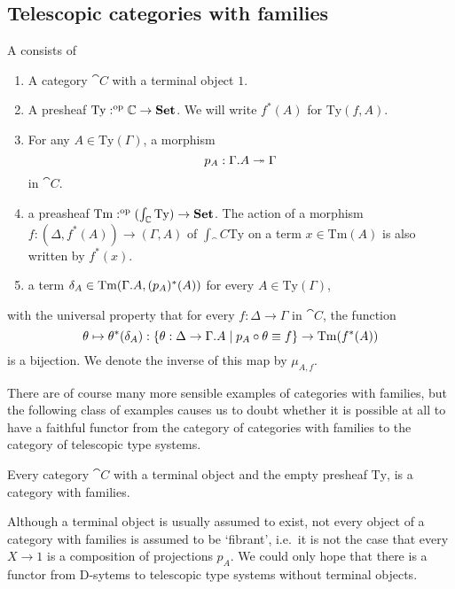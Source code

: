 \subsection{Telescopic categories with families}

\begin{defn}
A  consists of
\begin{enumerate}
\item A category $\cat{C}$ with a terminal object $1$.
\item A presheaf $\mathrm{Ty}:^{\mathrm{op}}{\mathbb{C}}\to\mathbf{Set}$. We will write
$f^\ast(A)$ for $\mathrm{Ty}(f,A)$.
\item For any $A\in\mathrm{Ty}(\Gamma)$, a morphism
\begin{equation*}
p_A : \ctxext{\Gamma}{A}\twoheadrightarrow \Gamma
\end{equation*}
in $\cat{C}$.
\item a preasheaf $\mathrm{Tm}:^{\mathrm{op}}{(\int_\mathbb{C}\mathrm{Ty})}\to\mathbf{Set}$.
The action of a morphism $f:(\Delta,f^\ast(A))\to(\Gamma,A)$ of $\int_\cat{C}\mathrm{Ty}$
on a term $x\in \mathrm{Tm}(A)$ is also written by $f^\ast(x)$.
\item a term $\delta_A\in\mathrm{Tm}(\ctxext{\Gamma}{A},(p_A)^\ast(A))$ for every
$A\in\mathrm{Ty}(\Gamma)$, 
\end{enumerate}
with the universal property that for every $f:\Delta\to\Gamma$ in $\cat{C}$, 
the function
\begin{equation*}
\theta\mapsto\theta^\ast(\delta_A)
  : \{\theta:\Delta\to\ctxext{\Gamma}{A}\mid p_A\circ\theta\jdeq f\}\to
    \mathrm{Tm}(f^\ast(A))
\end{equation*}
is a bijection. We denote the inverse of this map by $\mu_{A,f}$. 
\end{defn}

There are of course many more sensible examples of categories with families,
but the following class of examples causes us to doubt whether it is possible
at all to have a faithful functor from the category of categories
with families to the category of telescopic type systems. 

\begin{eg}
Every category $\cat{C}$ with a terminal object and the empty presheaf 
$\mathrm{Ty}$, is a category with families.
\end{eg}

\begin{rmk}
Although a terminal object is usually assumed to exist, not every object 
of a category with families is assumed to be `fibrant', i.e.~it is
not the case that every $X\to 1$ is a composition of projections $p_A$.
We could only hope that there is a functor from D-sytems to telescopic type systems without
terminal objects.
\end{rmk}

